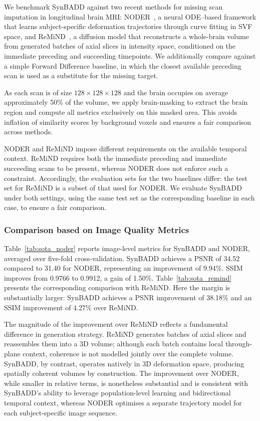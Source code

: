We benchmark SynBADD against two recent methods for missing scan imputation in longitudinal brain MRI: NODER~\cite{bai2024noder}, a neural ODE--based framework that learns subject-specific deformation trajectories through curve fitting in SVF space, and ReMiND~\cite{yuan2024remind}, a diffusion model that reconstructs a whole-brain volume from generated batches of axial slices in intensity space, conditioned on the immediate preceding and succeeding timepoints. We additionally compare against a simple Forward Difference baseline, in which the closest available preceding scan is used as a substitute for the missing target.

As each scan is of size $128 \times 128 \times 128$ and the brain occupies on average approximately 50\% of the volume, we apply brain-masking to extract the brain region and compute all metrics exclusively on this masked area. This avoids inflation of similarity scores by background voxels and ensures a fair comparison across methods.

NODER and ReMiND impose different requirements on the available temporal context. ReMiND requires both the immediate preceding and immediate succeeding scans to be present, whereas NODER does not enforce such a constraint. Accordingly, the evaluation sets for the two baselines differ: the test set for ReMiND is a subset of that used for NODER. We evaluate SynBADD under both settings, using the same test set as the corresponding baseline in each case, to ensure a fair comparison.


\subsubsection{Comparison based on Image Quality Metrics}

Table~\ref{tab:sota_noder} reports image-level metrics for SynBADD and NODER, averaged over five-fold cross-validation. SynBADD achieves a PSNR of 34.52 compared to 31.40 for NODER, representing an improvement of 9.94\%. SSIM improves from 0.9766 to 0.9912, a gain of 1.50\%. Table~\ref{tab:sota_remind} presents the corresponding comparison with ReMiND. Here the margin is substantially larger: SynBADD achieves a PSNR improvement of 38.18\% and an SSIM improvement of 4.27\% over ReMiND.

The magnitude of the improvement over ReMiND reflects a fundamental difference in generation strategy. ReMiND generates batches of axial slices and reassembles them into a 3D volume; although each batch contains local through-plane context, coherence is not modelled jointly over the complete volume. SynBADD, by contrast, operates natively in 3D deformation space, producing spatially coherent volumes by construction. The improvement over NODER, while smaller in relative terms, is nonetheless substantial and is consistent with SynBADD's ability to leverage population-level learning and bidirectional temporal context, whereas NODER optimises a separate trajectory model for each subject-specific image sequence.

